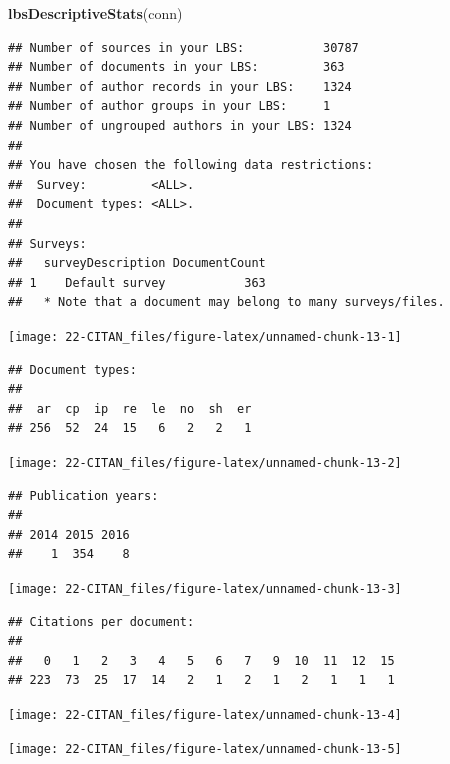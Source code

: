 \documentclass[
]{book}
\newenvironment{Shaded}{\begin{snugshade}}{\end{snugshade}}
\newcommand{\KeywordTok}[1]{\textcolor[rgb]{0.13,0.29,0.53}{\textbf{#1}}}
\newcommand{\NormalTok}[1]{#1}
\begin{document}
\begin{Shaded}
\begin{Highlighting}[]
\KeywordTok{lbsDescriptiveStats}\NormalTok{(conn)}
\end{Highlighting}
\end{Shaded}

\begin{verbatim}
## Number of sources in your LBS:           30787
## Number of documents in your LBS:         363
## Number of author records in your LBS:    1324
## Number of author groups in your LBS:     1
## Number of ungrouped authors in your LBS: 1324
## 
## You have chosen the following data restrictions:
##  Survey:         <ALL>.
##  Document types: <ALL>.
## 
## Surveys:
##   surveyDescription DocumentCount
## 1    Default survey           363
##   * Note that a document may belong to many surveys/files.
\end{verbatim}

\begin{center}\texttt{[image: 22-CITAN\_files/figure-latex/unnamed-chunk-13-1]} \end{center}

\begin{verbatim}
## Document types:
## 
##  ar  cp  ip  re  le  no  sh  er 
## 256  52  24  15   6   2   2   1
\end{verbatim}

\begin{center}\texttt{[image: 22-CITAN\_files/figure-latex/unnamed-chunk-13-2]} \end{center}

\begin{verbatim}
## Publication years:
## 
## 2014 2015 2016 
##    1  354    8
\end{verbatim}

\begin{center}\texttt{[image: 22-CITAN\_files/figure-latex/unnamed-chunk-13-3]} \end{center}

\begin{verbatim}
## Citations per document:
## 
##   0   1   2   3   4   5   6   7   9  10  11  12  15 
## 223  73  25  17  14   2   1   2   1   2   1   1   1
\end{verbatim}

\begin{center}\texttt{[image: 22-CITAN\_files/figure-latex/unnamed-chunk-13-4]} \end{center}

\begin{center}\texttt{[image: 22-CITAN\_files/figure-latex/unnamed-chunk-13-5]} \end{center}
\end{document}
